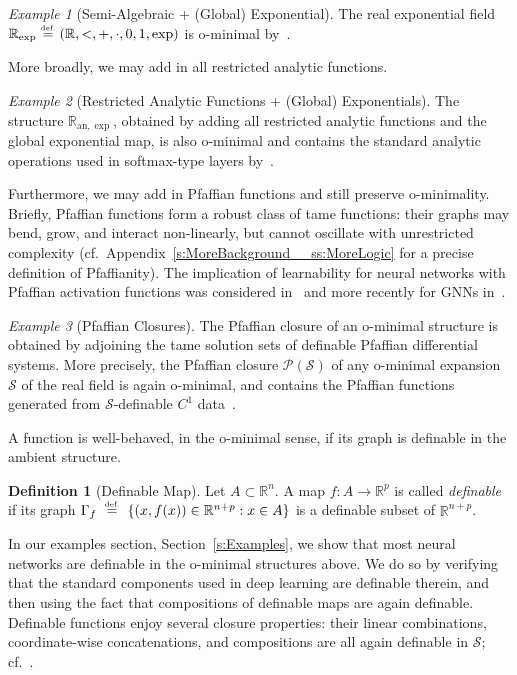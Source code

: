 \documentclass{article}
\newcommand{\eqdef}{\ensuremath{\stackrel{\mbox{\upshape\tiny def.}}{=}}}
\theoremstyle{plain}
\theoremstyle{definition}
\newtheorem{definition}[theorem]{Definition}
\theoremstyle{remark}
\newtheorem{example}{Example}
\theoremstyle{plain}
\numberwithin{thm}{section}
\theoremstyle{definition}
\numberwithin{equation}{section}
\begin{document}
\begin{example}[Semi-Algebraic + (Global) Exponential]
The real exponential field $\mathbb{R}_{\exp}\eqdef(\mathbb{R},<,+,\cdot,0,1,\exp)$ is o-minimal by~\cite{Wilkie1996}.      
\end{example}
More broadly, we may add in all restricted analytic functions.
\begin{example}[Restricted Analytic Functions + (Global) Exponentials]
The structure $\mathbb{R}_{\mathrm{an},\exp}$, obtained by adding all restricted analytic functions and the global exponential map, is also o-minimal and contains the standard analytic operations used in softmax-type layers by~\cite{vandenDriesMiller1996}.    
\end{example}
Furthermore, we may add in Pfaffian functions and still preserve o-minimality.  Briefly, Pfaffian functions form a robust class of tame functions: their graphs may bend, grow, and interact non-linearly, but cannot oscillate with unrestricted complexity (cf.\  Appendix~\ref{s:MoreBackground__ss:MoreLogic} for a precise definition of Pfaffianity). 
The implication of learnability for neural networks with Pfaffian activation functions was considered in~\cite{KarpinskiMacintyre1997} and more recently for GNNs in~\cite{d2024vc}.
\begin{example}[Pfaffian Closures]
The Pfaffian closure of an o-minimal structure is obtained by adjoining the tame solution sets of definable Pfaffian differential systems.  More precisely, the Pfaffian closure $\mathcal{P}(\mathcal{S})$ of any o-minimal expansion $\mathcal{S}$ of the real field is again o-minimal, and contains the Pfaffian functions generated from $\mathcal{S}$-definable $C^1$ data~\cite{speissegger1999pfaffian}.
\end{example}
A function is well-behaved, in the o-minimal sense, if its graph is definable in the ambient structure.
\begin{definition}[Definable Map]
\label{def:definable-map}
Let $A \subset \mathbb{R}^n$.  
A map
$
f : A \to \mathbb{R}^p
$
is called \emph{definable} if its graph
$
\Gamma_f \;\eqdef\; \{(x,f(x)) \in \mathbb{R}^{n+p} : x \in A\}
$
is a definable subset of $\mathbb{R}^{n+p}$.
\end{definition}
In our examples section, Section~\ref{s:Examples}, we show that most neural networks are definable in the o-minimal structures above.  
We do so by verifying that the standard components used in deep learning are definable therein, and then using the fact that compositions of definable maps are again definable.  
Definable functions enjoy several closure properties: their linear combinations, coordinate-wise concatenations, and compositions are all again definable in $\mathcal{S}$; cf.~\citep[Chapter 1.3]{coste1999introduction}.
\end{document}
